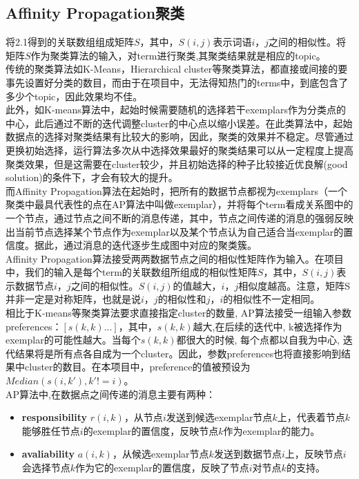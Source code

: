 \documentclass[a4paper]{article}
\begin{document}
\subsection{Affinity Propagation聚类}
将2.1得到的关联数组组成矩阵$S$，其中，$S(i,j)$表示词语$i$，$j$之间的相似性。将矩阵$S$作为聚类算法的输入，对term进行聚类,其聚类结果就是相应的topic。\\
\indent 传统的聚类算法如K-Means，Hierarchical cluster等聚类算法，都直接或间接的要事先设置好分类的数目，而由于在项目中，无法得知热门的terms中，到底包含了多少个topic，因此效果均不佳。\\
\indent 此外，如K-means算法中，起始时候需要随机的选择若干exemplars作为分类点的中心，此后通过不断的迭代调整cluster的中心点以缩小误差。在此类算法中，起始数据点的选择对聚类结果有比较大的影响，因此，聚类的效果并不稳定。尽管通过更换初始选择，运行算法多次从中选择效果最好的聚类结果可以从一定程度上提高聚类效果，但是这需要在cluster较少，并且初始选择的种子比较接近优良解(good solution)的条件下，才会有较大的提升。\\
\indent 而Affinity Propagation算法在起始时，把所有的数据节点都视为exemplars（一个聚类中最具代表性的点在AP算法中叫做exemplar），并将每个term看成关系图中的一个节点，通过节点之间不断的消息传递，其中，节点之间传递的消息的强弱反映出当前节点选择某个节点作为exemplar以及某个节点认为自己适合当exemplar的置信度。据此，通过消息的迭代逐步生成图中对应的聚类簇。\\
\indent Affinity Propagation算法接受两两数据节点之间的相似性矩阵作为输入。在项目中，我们的输入是每个term的关联数组所组成的相似性矩阵$S$，其中，$S(i,j)$表示数据节点$i$，$j$之间的相似性。$S(i,j)$的值越大，$i$，$j$相似度越高。注意，矩阵S并非一定是对称矩阵，也就是说$i$，$j$的相似性和$j$，$i$的相似性不一定相同。\\
\indent 相比于K-means等聚类算法要求直接指定cluster的数量, AP算法接受一组输入参数preferences：$[s(k,k)...]$，其中，$s(k,k)$越大,在后续的迭代中, k被选择作为exemplar的可能性越大。当每个$s(k,k)$都很大的时候, 每个点都以自我为中心, 迭代结果将是所有点各自成为一个cluster。因此，参数preferences也将直接影响到结果中cluster的数目。在本项目中，preference的值被预设为$Median(s(i,k'),k'!=i)$。\\
\indent AP算法中,在数据点之间传递的消息主要有两种：
\begin{itemize}
	\item \textbf{responsibility} $r(i,k)$，从节点$i$发送到候选exemplar节点$k$上，代表着节点$k$能够胜任节点$i$的exemplar的置信度，反映节点$k$作为exemplar的能力。
	\item \textbf{avaliability} $a(i,k)$，从候选exemplar节点$k$发送到数据节点$i$上，反映节点$i$会选择节点$k$作为它的exemplar的置信度，反映了节点$i$对节点$k$的支持。
\end{itemize}
\end{document}
